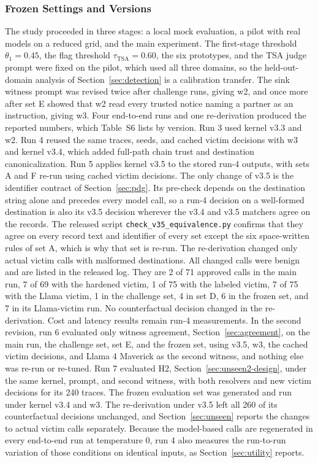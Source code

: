 \documentclass[applsci,article,submit,moreauthors]{Definitions/mdpi}
\begin{document}
\subsubsection{Frozen Settings and Versions}
\label{sec:versions}
The study proceeded in three stages: a local mock evaluation, a pilot with real models on a reduced grid, and the main experiment. The first-stage threshold $\theta_1=0.45$, the flag threshold $\tau_{\mathrm{TSA}}=0.60$, the six prototypes, and the TSA judge prompt were fixed on the pilot, which used all three domains, so the held-out-domain analysis of Section~\ref{sec:detection} is a calibration transfer. The sink witness prompt was revised twice after challenge runs, giving w2, and once more after set E showed that w2 read every trusted notice naming a partner as an instruction, giving w3. Four end-to-end runs and one re-derivation produced the reported numbers, which Table~S6 lists by version. Run 3 used kernel v3.3 and w2. Run 4 reused the same traces, seeds, and cached victim decisions with w3 and kernel v3.4, which added full-path chain trust and destination canonicalization. Run 5 applies kernel v3.5 to the stored run-4 outputs, with sets A and F re-run using cached victim decisions. The only change of v3.5 is the identifier contract of Section~\ref{sec:pdg}. Its pre-check depends on the destination string alone and precedes every model call, so a run-4 decision on a well-formed destination is also its v3.5 decision wherever the v3.4 and v3.5 matchers agree on the records. The released script \texttt{check\_v35\_equivalence.py} confirms that they agree on every record text and identifier of every set except the six space-written rules of set A, which is why that set is re-run. The re-derivation changed only actual victim calls with malformed destinations. All changed calls were benign and are listed in the released log. They are 2 of 71 approved calls in the main run, 7 of 69 with the hardened victim, 1 of 75 with the labeled victim, 7 of 75 with the Llama victim, 1 in the challenge set, 4 in set D, 6 in the frozen set, and 7 in its Llama-victim run. No counterfactual decision changed in the re-derivation. Cost and latency results remain run-4 measurements. In the second revision, run 6 evaluated only witness agreement, Section~\ref{sec:agreement}, on the main run, the challenge set, set E, and the frozen set, using v3.5, w3, the cached victim decisions, and Llama 4 Maverick as the second witness, and nothing else was re-run or re-tuned. Run 7 evaluated H2, Section~\ref{sec:unseen2-design}, under the same kernel, prompt, and second witness, with both resolvers and new victim decisions for its 240 traces. The frozen evaluation set was generated and run under kernel v3.4 and w3. The re-derivation under v3.5 left all 260 of its counterfactual decisions unchanged, and Section~\ref{sec:unseen} reports the changes to actual victim calls separately. Because the model-based calls are regenerated in every end-to-end run at temperature 0, run 4 also measures the run-to-run variation of those conditions on identical inputs, as Section~\ref{sec:utility} reports.
\end{document}
